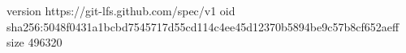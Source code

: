 version https://git-lfs.github.com/spec/v1
oid sha256:5048f0431a1bcbd7545717d55cd114c4ee45d12370b5894be9c57b8cf652aeff
size 496320
